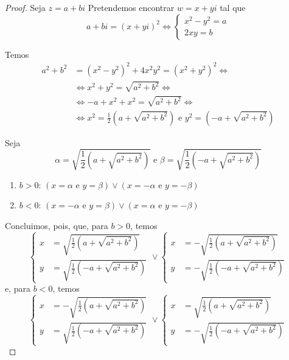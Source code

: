 \documentclass[12pt, oneside, a4paper, english, brazil]{abntex2}
\theoremstyle{normal}
\theoremstyle{observacao}
\begin{document}
\begin{proof}
Seja $z=a+bi$ Pretendemos encontrar $w=x+yi$ tal que 
\[
a+bi = (x+yi)^2 \Leftrightarrow \left\{\begin{array}{ll}
x^2-y^2=a\\
2xy=b
\end{array}
\right.
\]

Temos
\begin{align*}
a^2+b^2 &= (x^2-y^2)^2+4x^2y^2=(x^2+y^2)^2 \Leftrightarrow\\
&\Leftrightarrow x^2+y^2 = \sqrt{a^2+b^2} \Leftrightarrow\\
&\Leftrightarrow -a+x^2+x^2=\sqrt{a^2+b^2} \Leftrightarrow\\
&\Leftrightarrow x^2 = \frac{1}{2} \left(a+\sqrt{a^2+b^2}\right) \text{ e } y^2 = \left(-a+\sqrt{a^2+b^2}\right)
\end{align*}

Seja
\[
\alpha = \sqrt{\frac{1}{2} \left(a+\sqrt{a^2+b^2}\right)} \text{ e } \beta = \sqrt{\frac{1}{2} \left(-a+\sqrt{a^2+b^2}\right)}
\]
\begin{enumerate}
\item $b>0$: $(x=\alpha \text{ e } y=\beta) \vee (x=-\alpha \text{ e } y=-\beta)$
\item $b<0$: $(x=-\alpha \text{ e } y=\beta) \vee (x=\alpha \text{ e } y=-\beta)$
\end{enumerate}

Concluimos, pois, que, para $b>0$, temos
\[
\left\{\begin{array}{ll}
x &=\sqrt{\frac{1}{2} \left(a+\sqrt{a^2+b^2}\right)}\\
y &=\sqrt{\frac{1}{2} \left(-a+\sqrt{a^2+b^2}\right)}
\end{array}
\right.
\vee
\left\{\begin{array}{ll}
x &=-\sqrt{\frac{1}{2} \left(a+\sqrt{a^2+b^2}\right)}\\
y &=-\sqrt{\frac{1}{2} \left(-a+\sqrt{a^2+b^2}\right)}
\end{array}
\right.
\]
e, para $b<0$, temos
\[
\left\{\begin{array}{ll}
x &=-\sqrt{\frac{1}{2} \left(a+\sqrt{a^2+b^2}\right)}\\
y &=\sqrt{\frac{1}{2} \left(-a+\sqrt{a^2+b^2}\right)}
\end{array}
\right.
\vee
\left\{\begin{array}{ll}
x &=\sqrt{\frac{1}{2} \left(a+\sqrt{a^2+b^2}\right)}\\
y &=-\sqrt{\frac{1}{2} \left(-a+\sqrt{a^2+b^2}\right)}
\end{array}
\right.
\]
\end{proof}
\end{document}
